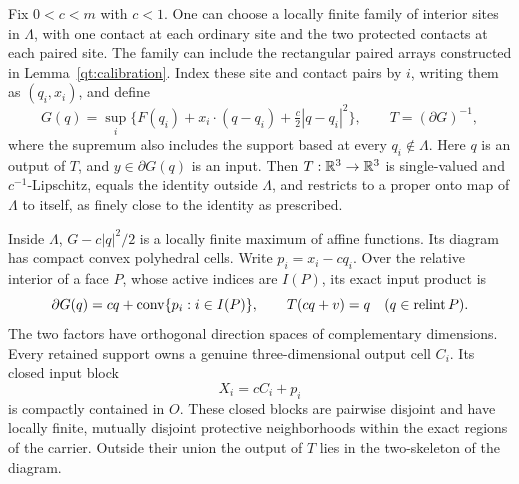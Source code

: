 \begin{proposition}\label{qt:quantizer}
Fix $0<c<m$ with $c<1$.  One can choose a locally finite family of
interior sites in $\Lambda$, with one contact at each ordinary site
and the two protected contacts at each paired site.  The family can
include the rectangular paired arrays constructed in
Lemma~\ref{qt:calibration}.  Index these site and contact pairs by
$i$, writing them as $(q_i,x_i)$, and define
\begin{equation}\label{qt:obstacle}
 G(q)=\sup_i\{F(q_i)+x_i\cdot(q-q_i)+\tfrac c2|q-q_i|^2\},
 \qquad T=(\partial G)^{-1},
\end{equation}
where the supremum also includes the support based at every
$q_i\notin\Lambda$.  Here $q$ is an output of $T$, and
$y\in\partial G(q)$ is an input.  Then $T:\mathbb R^3\to\mathbb R^3$ is single-valued and
$c^{-1}$-Lipschitz, equals the identity outside $\Lambda$, and restricts
to a proper onto map of $\Lambda$ to itself, as finely close to the
identity as prescribed.

Inside $\Lambda$, $G-c|q|^2/2$ is a locally finite maximum of affine
functions.  Its diagram has compact convex polyhedral cells.  Write
$p_i=x_i-cq_i$.  Over the relative interior of a face $P$, whose active
indices are $I(P)$, its exact input product is
\begin{equation}\label{qt:product}
 \partial G(q)=cq+\operatorname{conv}\{p_i:i\in I(P)\},\qquad
 T(cq+v)=q\quad(q\in\operatorname{relint} P).
\end{equation}
The two factors have orthogonal direction spaces of complementary
dimensions.  Every retained support owns a genuine three-dimensional
output cell $C_i$.  Its closed input block
\begin{equation}\label{qt:blocks}
 X_i=cC_i+p_i
\end{equation}
is compactly contained in $O$.  These closed blocks are pairwise
disjoint and have locally finite, mutually disjoint protective
neighborhoods within the exact regions of the carrier.  Outside their
union the output of $T$ lies in the two-skeleton of the diagram.
\end{proposition}


